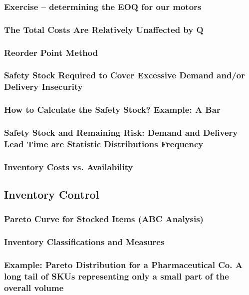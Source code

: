 \subsubsection{Exercise – determining the EOQ for our motors}

\subsubsection{The Total Costs Are Relatively Unaffected by Q}
\subsubsection{Reorder Point Method}
\subsubsection{Safety Stock Required to Cover Excessive Demand and/or Delivery Insecurity}
\subsubsection{How to Calculate the Safety Stock? Example: A Bar}
\subsubsection{Safety Stock and Remaining Risk: Demand and Delivery Lead Time are Statistic Distributions Frequency}
\subsubsection{Inventory Costs vs. Availability}
\subsection{Inventory Control}
\subsubsection{Pareto Curve for Stocked Items (ABC Analysis)}
\subsubsection{Inventory Classifications and Measures}
\subsubsection{Example: Pareto Distribution for a Pharmaceutical Co. A long tail of SKUs representing only a small part of the overall volume }
